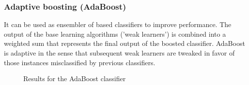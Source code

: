 \subsubsection{Adaptive boosting (AdaBoost)}
It can be used as ensembler of based classifiers to improve performance. The output of the base learning algorithms ('weak learners') is combined into a weighted sum that represents the final output of the boosted classifier. AdaBoost is adaptive in the sense that subsequent weak learners are tweaked in favor of those instances misclassified by previous classifiers.
\begin{figure}[H]
    \centering
    \caption{Results for the AdaBoost classifier}
    \label{fig:AdaBoostResults}
\end{figure}

